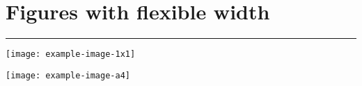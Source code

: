 \section{Figures with flexible width}

\hrule %

\texttt{[image: example-image-1x1]}

\texttt{[image: example-image-a4]}

